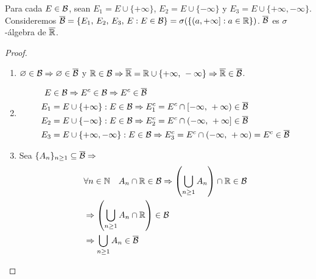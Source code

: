 \begin{definition}
    Para cada $E \in \mathcal{B}$, sean $E_1 = E \cup \{ + \infty \}$, $E_2 = E \cup \{ - \infty \}$ y $E_3 = E \cup \{ + \infty, - \infty \}$.
    Consideremos $\overline{\mathcal{B}} = \{ E_1 \text{, } E_2 \text{, } E_3 \text{, } E : E \in \mathcal{B} \} = \sigma(\{ (a, +\infty] : a \in \mathbb{R} \})$.
    $\overline{\mathcal{B}}$ es $\sigma$-álgebra de $\overline{\mathbb{R}}$.

    \begin{proof}
        \begin{enumerate}
            \item $\varnothing \in \mathcal{B} \Rightarrow \varnothing \in \overline{\mathcal{B}}$ y $\mathbb{R} \in \mathcal{B} \Rightarrow \overline{\mathbb{R}} = \mathbb{R} \cup \{ +\infty \text{, } -\infty \} \Rightarrow \overline{\mathbb{R}} \in \overline{\mathcal{B}}$.
            \item \begin{align*}
                      E   & \in \mathcal{B} \Rightarrow E^c \in \mathcal{B} \Rightarrow E^c \in \overline{\mathcal{B}}                                                          \\
                      E_1 & = E \cup \{ +\infty \} : E \in \mathcal{B} \Rightarrow E_1^c = E^c \cap [-\infty \text{, } + \infty) \in \overline{\mathcal{B}}                \\
                      E_2 & = E \cup \{ -\infty \} : E \in \mathcal{B} \Rightarrow E_2^c = E^c \cap (-\infty \text{, } + \infty] \in \overline{\mathcal{B}}                \\
                      E_3 & = E \cup \{ +\infty, -\infty \} : E \in \mathcal{B} \Rightarrow E_3^c = E^c \cap (-\infty \text{, } + \infty) = E^c \in \overline{\mathcal{B}}
                  \end{align*}
            \item Sea $\{ A_n \}_{n \geq 1} \subseteq \overline{\mathcal{B}} \Rightarrow$ \begin{align*}
                       & \forall n \in \mathbb{N} \quad A_n \cap \mathbb{R} \in \mathcal{B} \Rightarrow \left( \bigcup_{n \geq 1} A_n \right) \cap \mathbb{R} \in \mathcal{B} \\
                       & \Rightarrow \left( \bigcup_{n \geq 1} A_n \cap \mathbb{R} \right) \in \mathcal{B}                                               \\
                       & \Rightarrow \bigcup_{n \geq 1} A_n \in \overline{\mathcal{B}}
                  \end{align*}
        \end{enumerate}
    \end{proof}
\end{definition}